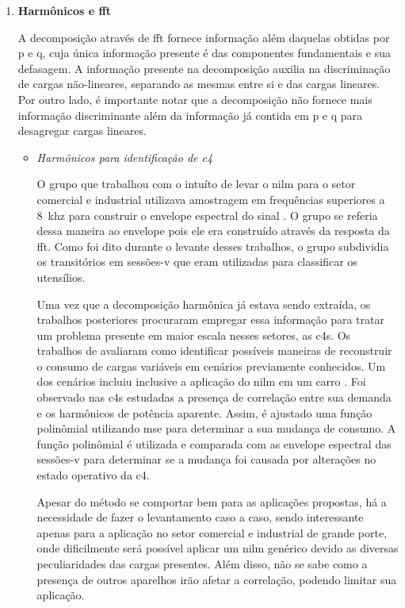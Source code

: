 \begin{enumerate}[label=\textbf{2.\arabic*},wide=\parindent]
\item \textbf{Harmônicos e \gls{fft}}
\label{nilm:harmonic_fft}

A decomposição através de \gls{fft} fornece informação além daquelas
obtidas por \gls{p} e \gls{q}, cuja única informação presente é das
componentes fundamentais e sua defasagem. A informação presente na
decomposição auxilia na discriminação de cargas não-lineares,
separando as mesmas entre si e das cargas lineares. Por outro lado, é
importante notar que a decomposição não fornece mais informação
discriminante além da informação já contida em \gls{p} e \gls{q} para
desagregar cargas lineares.

\begin{itemize}[wide=\parindent]
\item \emph{Harmônicos para identificação de \acs{c4}}

O grupo que trabalhou com o intuíto de levar o \gls{nilm} para o setor
comercial e industrial \cite{nilm_norford_leeb_medianfilt_1996_13,
nilm_leeb_spectral_envelope_1995_23} utilizava amostragem em
frequências superiores a 8~k\acs{hz} para construir o envelope
espectral do sinal \cite{nilm_laughman_continuous_variables_2003_9}. O
grupo se referia dessa maneira ao envelope pois ele era construído
através da resposta da \gls{fft}. Como foi dito durante o levante
desses trabalhos, o grupo subdividia os transitórios em sessões-v que
eram utilizadas para classificar os utensílios. 

Uma vez que a decomposição harmônica já estava sendo extraída, os
trabalhos posteriores procuraram empregar essa informação para tratar
um problema presente em maior escala nesses setores, as \glspl{c4}.
Os trabalhos de \citet{nilm_lee_variable_speed_estimation_2005_24,
nilm_wichakool_2009_25,nilm_shaw_2008_26} avaliaram como identificar
possíveis maneiras de reconstruir o consumo de cargas variáveis
em cenários previamente conhecidos. Um dos cenários incluiu inclusive
a aplicação do \gls{nilm} em um carro \cite{nilm_shaw_2008_26}.
Foi observado nas \glspl{c4} estudadas a presença de correlação entre
sua demanda e os harmônicos de potência aparente. Assim, é ajustado
uma função polinômial utilizando \gls{mse} para determinar a sua
mudança de consumo. A função polinômial é utilizada e comparada com as
envelope espectral das sessões-v para determinar se a mudança foi
causada por alterações no estado operativo da \gls{c4}.

Apesar do método se comportar bem para as aplicações propostas,
há a necessidade de fazer o levantamento caso a caso, sendo
interessante apenas para a aplicação no setor comercial e industrial
de grande porte, onde dificilmente será possível aplicar um \gls{nilm}
genérico devido as diversas peculiaridades das cargas presentes. Além
disso, não se sabe como a presença de outros aparelhos irão afetar a
correlação, podendo limitar sua aplicação.


\end{itemize}
\end{enumerate}
